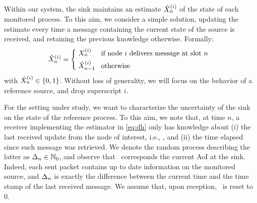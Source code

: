 Within our system, the sink maintains an estimate $\hat{X}_n^{(i)}$ of the state of each monitored process. To this aim, we consider a simple solution, updating the estimate every time a message containing the current state of the source is received, and retaining the previous knowledge otherwise. Formally:
\begin{align}
    \!\!\!\!\Estn^{(i)} = 
    \begin{split}
    \begin{cases}
        \hspace*{.3em} \Mcni            \!\!\!& \text{ if node $i$ delivers message at slot $n$}\\[.3em]
        \hspace*{.3em} \Est_{n-1}^{(i)} \!\!\!& \text{ otherwise}
    \end{cases}
    \end{split}
    \label{eq:dh}
\end{align} 
with $\hat{X}_n^{(i)}\in\{0,1\}$. Without loss of generality, we will focus on the behavior of a reference source, and drop superscript $i$.
 
For the setting under study, we want to characterize the uncertainty of the sink on the state of the reference process. To this aim, we note that, at time $n$, a receiver implementing the estimator in \eqref{eq:dh} only has knowledge about (i) the last received update from the node of interest, i.e., \Estn, and (ii) the time elapsed since such message was retrieved. We denote the random process describing the latter as $\Delta_n \in \mathbb N_0$, and observe that \Agen\ corresponds the current AoI \cite{Yates20_Survey} at the sink. Indeed, each sent packet contains up to date information on the monitored source, %
and $\Delta_n$ is exactly the difference between the current time and the time stamp of the last received message. We assume that, upon reception, \Agen\ is reset to $0$.

